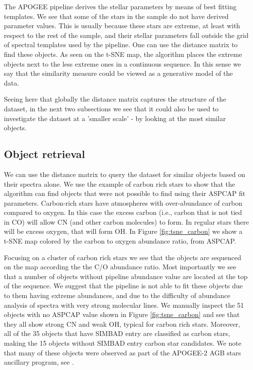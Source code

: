 \documentclass[fleqn,usenatbib]{mnras}
\begin{document}
The APOGEE pipeline derives the stellar parameters by means of best fitting templates. We see that some of the stars in the sample do not have derived parameter values. This is usually because these stars are extreme, at least with respect to the rest of the sample, and their stellar parameters fall outside the grid of spectral templates used by the pipeline. One can use the distance matrix to find these objects. As seen on the t-SNE map, the algorithm places the extreme objects next to the less extreme ones in a continuous sequence. In this sense we say that the similarity measure could be viewed as a generative model of the data. 

Seeing here that globally the distance matrix captures the structure of the dataset, in the next two subsections we see that it could also be used to investigate the dataset at a 'smaller scale' - by looking at the most similar objects.

\subsection{Object retrieval}
\label{sec:tsne_carbon}
We can use the distance matrix to query the dataset for similar objects based on their spectra alone. We use the example of carbon rich stars to show that the algorithm can find objects that were not possible to find using their ASPCAP fit parameters. Carbon-rich stars have atmospheres with over-abundance of carbon compared to oxygen. In this case the excess carbon (i.e., carbon that is not tied in $\mathrm{CO}$) will allow $\mathrm{CN}$ (and other carbon molecules) to form. In regular stars there will be excess oxygen, that will form $\mathrm{OH}$. In Figure \ref{fig:tsne_carbon} we show a t-SNE map colored by the carbon to oxygen abundance ratio, from ASPCAP.

Focusing on a cluster of carbon rich stars we see that the objects are sequenced on the map according the the C/O abundance ratio. Most importantly we see that a number of objects without pipeline abundance value are located at the top of the sequence. We suggest that the pipeline is not able to fit these objects due to them having extreme abundances, and due to the difficulty of abundance analysis of spectra with very strong molecular lines. We manually inspect the 51 objects with no ASPCAP value shown in Figure \ref{fig:tsne_carbon} and see that they all show strong $\mathrm{CN}$ and weak $\mathrm{OH}$, typical for carbon rich stars. Moreover, all of the 35 objects that have SIMBAD \citep[][]{wenger00} entry are classified as carbon stars, making the 15 objects without SIMBAD entry carbon star candidates. We note that many of these objects were observed as part of the APOGEE-2 AGB stars ancillary program, see \citet{zasowski17}.
\end{document}
